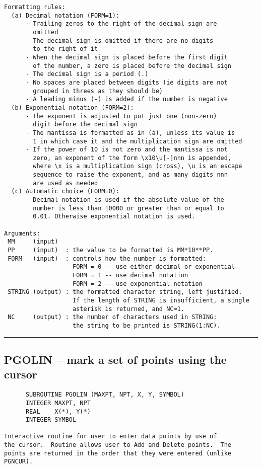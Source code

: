{\begin{verbatim}
Formatting rules:
  (a) Decimal notation (FORM=1):
      - Trailing zeros to the right of the decimal sign are
        omitted
      - The decimal sign is omitted if there are no digits
        to the right of it
      - When the decimal sign is placed before the first digit
        of the number, a zero is placed before the decimal sign
      - The decimal sign is a period (.)
      - No spaces are placed between digits (ie digits are not
        grouped in threes as they should be)
      - A leading minus (-) is added if the number is negative
  (b) Exponential notation (FORM=2):
      - The exponent is adjusted to put just one (non-zero)
        digit before the decimal sign
      - The mantissa is formatted as in (a), unless its value is
        1 in which case it and the multiplication sign are omitted
      - If the power of 10 is not zero and the mantissa is not
        zero, an exponent of the form \x10\u[-]nnn is appended,
        where \x is a multiplication sign (cross), \u is an escape
        sequence to raise the exponent, and as many digits nnn
        are used as needed
  (c) Automatic choice (FORM=0):
        Decimal notation is used if the absolute value of the
        number is less than 10000 or greater than or equal to
        0.01. Otherwise exponential notation is used.

Arguments:
 MM     (input)
 PP     (input)  : the value to be formatted is MM*10**PP.
 FORM   (input)  : controls how the number is formatted:
                   FORM = 0 -- use either decimal or exponential
                   FORM = 1 -- use decimal notation
                   FORM = 2 -- use exponential notation
 STRING (output) : the formatted character string, left justified.
                   If the length of STRING is insufficient, a single
                   asterisk is returned, and NC=1.
 NC     (output) : the number of characters used in STRING:
                   the string to be printed is STRING(1:NC).
\end{verbatim}
\hrule


\subsection*{PGOLIN -- mark a set of points using the cursor }
\begin{verbatim}
      SUBROUTINE PGOLIN (MAXPT, NPT, X, Y, SYMBOL)
      INTEGER MAXPT, NPT
      REAL    X(*), Y(*)
      INTEGER SYMBOL

Interactive routine for user to enter data points by use of
the cursor.  Routine allows user to Add and Delete points.  The
points are returned in the order that they were entered (unlike
PGNCUR).


\end{verbatim}}
